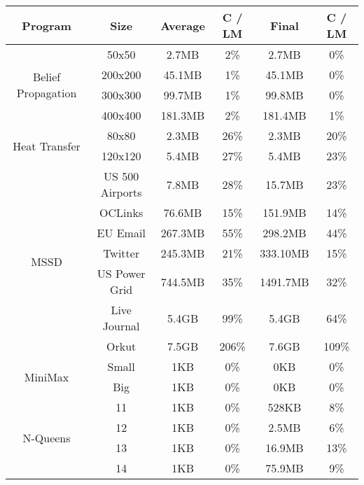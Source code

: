 \begin{tabular}{c | c || c | c || c | c} \hline
	\textbf{Program} & \textbf{Size} & \textbf{Average} & \textbf{C / LM} & \textbf{Final} & \textbf{C / LM} \\ \hline \hline
	\multirow{4}{*}{Belief Propagation}  & 50x50 & 2.7MB & 2\% & 2.7MB  &  0\%
\\
		 & 200x200 & 45.1MB & 1\% & 45.1MB  &  0\%
\\
		 & 300x300 & 99.7MB & 1\% & 99.8MB  &  0\%
\\
		 & 400x400 & 181.3MB & 2\% & 181.4MB  &  1\%
\\
	\hline
	\multirow{2}{*}{Heat Transfer}  & 80x80 & 2.3MB & 26\% & 2.3MB  &  20\%
\\
		 & 120x120 & 5.4MB & 27\% & 5.4MB  &  23\%
\\
	\hline
	\multirow{7}{*}{MSSD}  & US 500 Airports & 7.8MB & 28\% & 15.7MB  &  23\%
\\
		 & OCLinks & 76.6MB & 15\% & 151.9MB  &  14\%
\\
		 & EU Email & 267.3MB & 55\% & 298.2MB  &  44\%
\\
		 & Twitter & 245.3MB & 21\% & 333.10MB  &  15\%
\\
		 & US Power Grid & 744.5MB & 35\% & 1491.7MB  &  32\%
\\
		 & Live Journal & 5.4GB & 99\% & 5.4GB  &  64\%
\\
		 & Orkut & 7.5GB & 206\% & 7.6GB  &  109\%
\\
	\hline
	\multirow{2}{*}{MiniMax}  & Small & 1KB & 0\% & 0KB  &  0\%
\\
		 & Big & 1KB & 0\% & 0KB  &  0\%
\\
	\hline
	\multirow{4}{*}{N-Queens}  & 11 & 1KB & 0\% & 528KB  &  8\%
\\
		 & 12 & 1KB & 0\% & 2.5MB  &  6\%
\\
		 & 13 & 1KB & 0\% & 16.9MB  &  13\%
\\
		 & 14 & 1KB & 0\% & 75.9MB  &  9\%
\\
	\hline
\end{tabular}
